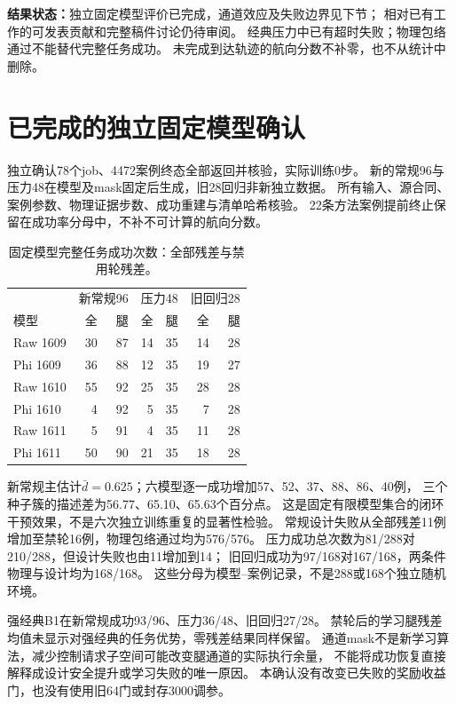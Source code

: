 \documentclass[UTF8,a4paper,11pt]{ctexart}
\begin{document}
\textbf{结果状态：}独立固定模型评价已完成，通道效应及失败边界见下节；
相对已有工作的可发表贡献和完整稿件讨论仍待审阅。
经典压力中已有超时失败；物理包络通过不能替代完整任务成功。
未完成到达轨迹的航向分数不补零，也不从统计中删除。

\section{已完成的独立固定模型确认}
独立确认78个job、4472案例终态全部返回并核验，实际训练0步。
新的常规96与压力48在模型及mask固定后生成，旧28回归非新独立数据。
所有输入、源合同、案例参数、物理证据步数、成功重建与清单哈希核验。
22条方法案例提前终止保留在成功率分母中，不补不可计算的航向分数。

\begin{table}[ht]
\centering
\caption{固定模型完整任务成功次数：全部残差与禁用轮残差。}
\begin{tabular}{lrrrrrr}\toprule
&\multicolumn{2}{c}{新常规96}&\multicolumn{2}{c}{压力48}&\multicolumn{2}{c}{旧回归28}\\
模型&全&腿&全&腿&全&腿\\\midrule
Raw 1609 & 30 & 87 & 14 & 35 & 14 & 28\\
Phi 1609 & 36 & 88 & 12 & 35 & 19 & 27\\
Raw 1610 & 55 & 92 & 25 & 35 & 28 & 28\\
Phi 1610 & 4 & 92 & 5 & 35 & 7 & 28\\
Raw 1611 & 5 & 91 & 4 & 35 & 11 & 28\\
Phi 1611 & 50 & 90 & 21 & 35 & 18 & 28\\
\bottomrule\end{tabular}
\end{table}

新常规主估计$\bar d=0.625$；六模型逐一成功增加57、52、37、88、86、40例，
三个种子簇的描述差为56.77、65.10、65.63个百分点。
这是固定有限模型集合的闭环干预效果，不是六次独立训练重复的显著性检验。
常规设计失败从全部残差11例增加至禁轮16例，物理包络通过均为576/576。
压力成功总次数为81/288对210/288，但设计失败也由11增加到14；
旧回归成功为97/168对167/168，两条件物理与设计均为168/168。
这些分母为模型--案例记录，不是288或168个独立随机环境。

强经典B1在新常规成功93/96、压力36/48、旧回归27/28。
禁轮后的学习腿残差均值未显示对强经典的任务优势，零残差结果同样保留。
通道mask不是新学习算法，减少控制请求子空间可能改变腿通道的实际执行余量，
不能将成功恢复直接解释成设计安全提升或学习失败的唯一原因。
本确认没有改变已失败的奖励收益门，也没有使用旧64门或封存3000调参。
\end{document}
